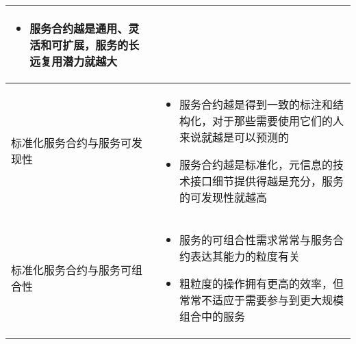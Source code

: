 \begin{longtable}{|m{3cm}<{\centering}|m{12cm}|}
\begin{itemize}[leftmargin=1.5em,itemsep=-3pt,topsep=-3pt]
        \item 服务合约越是通用、灵活和可扩展，服务的长远复用潜力就越大
    \vspace{-1.5em}
    \end{itemize}  
    \\ \hline
    标准化服务合约与服务可发现性 
    & 
    \vspace{-1.3em}
    \begin{itemize}[leftmargin=1.5em,itemsep=-3pt,topsep=-3pt]
        \item 服务合约越是得到一致的标注和结构化，对于那些需要使用它们的人来说就越是可以预测的
        \item 服务合约越是标准化，元信息的技术接口细节提供得越是充分，服务的可发现性就越高
    \vspace{-1.5em}
    \end{itemize}  
    \\ \hline
    标准化服务合约与服务可组合性 
    & 
    \vspace{-1.3em}
    \begin{itemize}[leftmargin=1.5em,itemsep=-3pt,topsep=-3pt]
        \item 服务的可组合性需求常常与服务合约表达其能力的粒度有关
        \item 粗粒度的操作拥有更高的效率，但常常不适应于需要参与到更大规模组合中的服务
    \vspace{-1.5em}
    \end{itemize}  
    \\ \hline
\end{longtable}